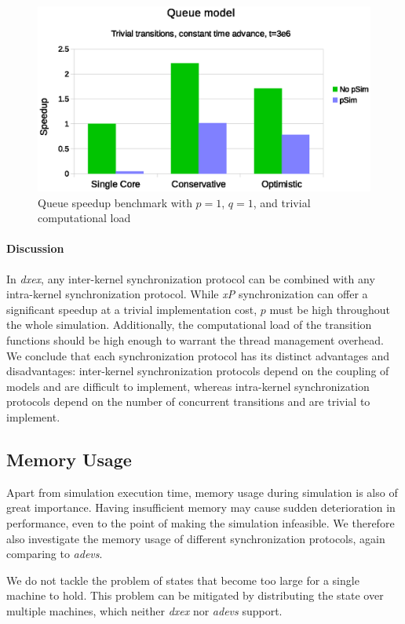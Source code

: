 \begin{figure}
	\center
	\includegraphics[width=\columnwidth]{fig/pdevs_no_sleep.eps}
	\caption{Queue speedup benchmark with $p = 1$, $q = 1$, and trivial computational load}
	\label{fig:psim_plot_no_sleep}
\end{figure}

\paragraph{Discussion}
In \textit{dxex}, any inter-kernel synchronization protocol can be combined with any intra-kernel synchronization protocol.
While \textit{xP} synchronization can offer a significant speedup at a trivial implementation cost, $p$ must be high throughout the whole simulation.
Additionally, the computational load of the transition functions should be high enough to warrant the thread management overhead.
We conclude that each synchronization protocol has its distinct advantages and disadvantages:
inter-kernel synchronization protocols depend on the coupling of models and are difficult to implement, whereas intra-kernel synchronization protocols depend on the number of concurrent transitions and are trivial to implement.

\subsection{Memory Usage}
Apart from simulation execution time, memory usage during simulation is also of great importance.
Having insufficient memory may cause sudden deterioration in performance, even to the point of making the simulation infeasible.
We therefore also investigate the memory usage of different synchronization protocols, again comparing to \textit{adevs}.

We do not tackle the problem of states that become too large for a single machine to hold.
This problem can be mitigated by distributing the state over multiple machines, which neither \textit{dxex} nor \textit{adevs} support.

